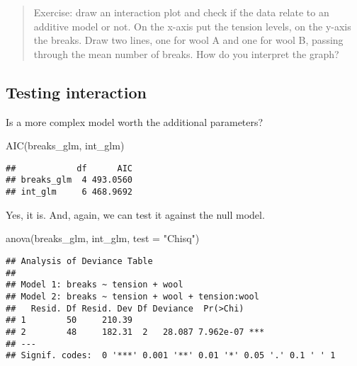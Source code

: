 \documentclass[
  oneside]{book}
\newenvironment{Shaded}{\begin{snugshade}}{\end{snugshade}}
\newcommand{\AttributeTok}[1]{\textcolor[rgb]{0.77,0.63,0.00}{#1}}
\newcommand{\FunctionTok}[1]{\textcolor[rgb]{0.00,0.00,0.00}{#1}}
\newcommand{\NormalTok}[1]{#1}
\newcommand{\OtherTok}[1]{\textcolor[rgb]{0.56,0.35,0.01}{#1}}
\newcommand{\SpecialCharTok}[1]{\textcolor[rgb]{0.00,0.00,0.00}{#1}}
\newcommand{\StringTok}[1]{\textcolor[rgb]{0.31,0.60,0.02}{#1}}
\begin{document}
\begin{quote}
Exercise: draw an interaction plot and check if the data
relate to an additive model or not. On the x-axis put the tension levels, on
the y-axis the breaks. Draw two lines, one for wool A and one for wool B,
passing through the mean number of breaks. How do you interpret the graph?
\end{quote}

\hypertarget{testing-interaction}{%
\subsection{Testing interaction}\label{testing-interaction}}

Is a more complex model worth the additional parameters?

\begin{Shaded}
\begin{Highlighting}[]
\FunctionTok{AIC}\NormalTok{(breaks\_glm, int\_glm)}
\end{Highlighting}
\end{Shaded}

\begin{verbatim}
##            df      AIC
## breaks_glm  4 493.0560
## int_glm     6 468.9692
\end{verbatim}

Yes, it is. And, again, we can test it against the
null model.

\begin{Shaded}
\end{Shaded}

\begin{Shaded}
\begin{Highlighting}[]
\FunctionTok{anova}\NormalTok{(breaks\_glm, int\_glm, }\AttributeTok{test =} \StringTok{"Chisq"}\NormalTok{)}
\end{Highlighting}
\end{Shaded}

\begin{verbatim}
## Analysis of Deviance Table
## 
## Model 1: breaks ~ tension + wool
## Model 2: breaks ~ tension + wool + tension:wool
##   Resid. Df Resid. Dev Df Deviance  Pr(>Chi)    
## 1        50     210.39                          
## 2        48     182.31  2   28.087 7.962e-07 ***
## ---
## Signif. codes:  0 '***' 0.001 '**' 0.01 '*' 0.05 '.' 0.1 ' ' 1
\end{verbatim}
\end{document}

